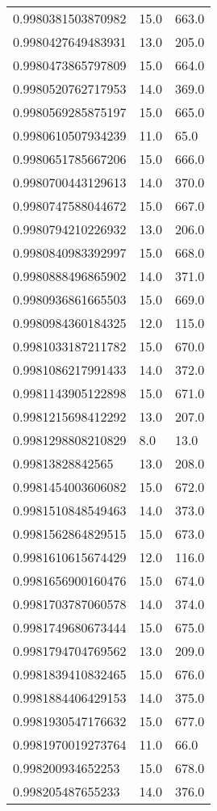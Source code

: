 \begin{center}
\begin{supertabular}[H]{p{0.30\textwidth}p{0.05\textwidth}p{0.05\textwidth}}
0.9980381503870982 & 15.0 & 663.0 \\ 
0.9980427649483931 & 13.0 & 205.0 \\ 
0.9980473865797809 & 15.0 & 664.0 \\ 
0.9980520762717953 & 14.0 & 369.0 \\ 
0.9980569285875197 & 15.0 & 665.0 \\ 
0.9980610507934239 & 11.0 & 65.0 \\ 
0.9980651785667206 & 15.0 & 666.0 \\ 
0.9980700443129613 & 14.0 & 370.0 \\ 
0.9980747588044672 & 15.0 & 667.0 \\ 
0.9980794210226932 & 13.0 & 206.0 \\ 
0.9980840983392997 & 15.0 & 668.0 \\ 
0.9980888496865902 & 14.0 & 371.0 \\ 
0.9980936861665503 & 15.0 & 669.0 \\ 
0.9980984360184325 & 12.0 & 115.0 \\ 
0.9981033187211782 & 15.0 & 670.0 \\ 
0.9981086217991433 & 14.0 & 372.0 \\ 
0.9981143905122898 & 15.0 & 671.0 \\ 
0.9981215698412292 & 13.0 & 207.0 \\ 
0.9981298808210829 & 8.0 & 13.0 \\ 
0.99813828842565 & 13.0 & 208.0 \\ 
0.9981454003606082 & 15.0 & 672.0 \\ 
0.9981510848549463 & 14.0 & 373.0 \\ 
0.9981562864829515 & 15.0 & 673.0 \\ 
0.9981610615674429 & 12.0 & 116.0 \\ 
0.9981656900160476 & 15.0 & 674.0 \\ 
0.9981703787060578 & 14.0 & 374.0 \\ 
0.9981749680673444 & 15.0 & 675.0 \\ 
0.9981794704769562 & 13.0 & 209.0 \\ 
0.9981839410832465 & 15.0 & 676.0 \\ 
0.9981884406429153 & 14.0 & 375.0 \\ 
0.9981930547176632 & 15.0 & 677.0 \\ 
0.9981970019273764 & 11.0 & 66.0 \\ 
0.998200934652253 & 15.0 & 678.0 \\ 
0.998205487655233 & 14.0 & 376.0 \\ 

\end{supertabular}
\end{center}
